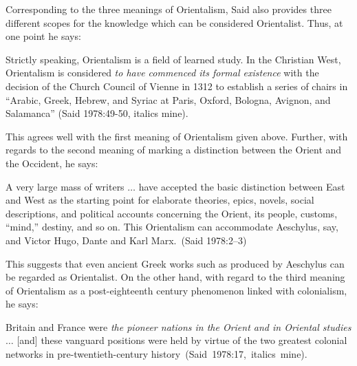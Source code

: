 Corresponding to the three meanings of Orientalism, Said also provides three different scopes for the knowledge which can be considered Orientalist. Thus, at one point he says:
\begin{myquote}
Strictly speaking, Orientalism is a field of learned study. In the Christian West, Orientalism is considered {\sl to have commenced its formal existence} with the decision of the Church Council of Vienne in 1312 to establish a series of chairs in “Arabic, Greek, Hebrew, and Syriac at Paris, Oxford, Bologna, Avignon, and Salamanca” \hfill(Said 1978:49-50, italics mine).
\end{myquote}

This agrees well with the first meaning of Orientalism given above. Further, with regards to the second meaning of marking a distinction between the Orient and the Occident, he says:
\begin{myquote}
A very large mass of writers $\ldots$ have accepted the basic distinction between East and West as the starting point for elaborate theories, epics, novels, social descriptions, and political accounts concerning the Orient, its people, customs, “mind,” destiny, and so on. This Orientalism can accommodate Aeschylus, say, and Victor Hugo, Dante and Karl Marx.~\hfill(Said 1978:2--3)
\end{myquote}
\newpage

This suggests that even ancient Greek works such as produced by Aeschylus can be regarded as Orientalist. On the other hand, with regard to the third meaning of Orientalism as a post-eighteenth century phenomenon linked with colonialism, he says:
\begin{myquote}
Britain and France were {\sl the pioneer nations in the Orient and in Oriental studies} $\ldots$ [and] these vanguard positions were held by virtue of the two greatest colonial networks in pre-twentieth-century history~\hfill(Said~1978:17,~italics~mine).
\end{myquote}
\smallskip

